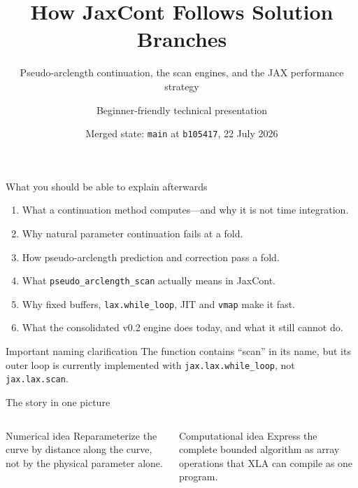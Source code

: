 \documentclass[aspectratio=169,10pt]{beamer}
\title{How JaxCont Follows Solution Branches}
\subtitle{Pseudo-arclength continuation, the scan engines, and the JAX performance strategy}
\author{Beginner-friendly technical presentation}
\date{Merged state: \texttt{main} at \texttt{b105417}, 22 July 2026}
\newcommand{\state}{\bm{u}}
\begin{document}
\begin{frame}
  \titlepage
\end{frame}

\begin{frame}{What you should be able to explain afterwards}
\begin{enumerate}
  \item What a continuation method computes---and why it is not time integration.
  \item Why natural parameter continuation fails at a fold.
  \item How pseudo-arclength prediction and correction pass a fold.
  \item What \texttt{pseudo\_arclength\_scan} actually means in JaxCont.
  \item Why fixed buffers, \texttt{lax.while\_loop}, JIT and \texttt{vmap} make it fast.
  \item What the consolidated v0.2 engine does today, and what it still cannot do.
\end{enumerate}
\begin{alertblock}{Important naming clarification}
The function contains ``scan'' in its name, but its outer loop is currently
implemented with \texttt{jax.lax.while\_loop}, not \texttt{jax.lax.scan}.
\end{alertblock}
\end{frame}

\begin{frame}{The story in one picture}
\centering
{}
\vspace{8mm}
\begin{columns}[T]
\begin{block}{Numerical idea}
Reparameterize the curve by distance along the curve, not by the physical parameter alone.
\end{block}
\begin{block}{Computational idea}
Express the complete bounded algorithm as array operations that XLA can compile as one program.
\end{block}
\end{columns}
\end{frame}
\end{document}
